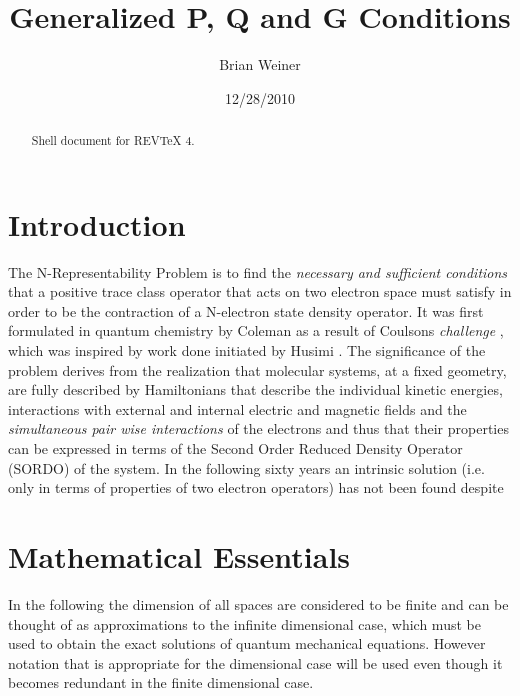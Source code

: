 \documentclass[aps,preprint]{revtex4}%
\begin{document}
\title[P,Q, and G Conditions]{Generalized P, Q and G Conditions}
\author{Brian Weiner}

\begin{abstract}
Shell document for REV\TeX{} 4.

\end{abstract}
\date{12/28/2010}
\maketitle
\tableofcontents


\section{Introduction \label{Inro}}

The N-Representability Problem is to find the \emph{necessary and sufficient
conditions} that a positive trace class operator that acts on two electron
space must satisfy in order to be the contraction of a N-electron state
density operator. It was first formulated in quantum chemistry \cite{Coleman1}
by Coleman as a result of Coulsons \emph{challenge }\cite{Coulson}, which was
inspired by work done initiated by Husimi \cite{Husimi}. The significance of
the problem derives from the realization that molecular systems, at a fixed
geometry, are fully described by Hamiltonians that describe the individual
kinetic energies, interactions with external and internal electric and
magnetic fields and the \emph{simultaneous pair wise interactions} of the
electrons and thus that their properties can be expressed in terms of the
Second Order Reduced Density Operator (SORDO) of the system. In the following
sixty years an intrinsic solution (i.e. only in terms of properties of two
electron operators) has not been found despite

\section{Mathematical Essentials \label{Math}}

In the following the dimension of all spaces are considered to be finite and
can be thought of as approximations to the infinite dimensional case, which
must be used to obtain the exact solutions of quantum mechanical equations.
However notation that is appropriate for the dimensional case will be used
even though it becomes redundant in the finite dimensional case.
\end{document}
